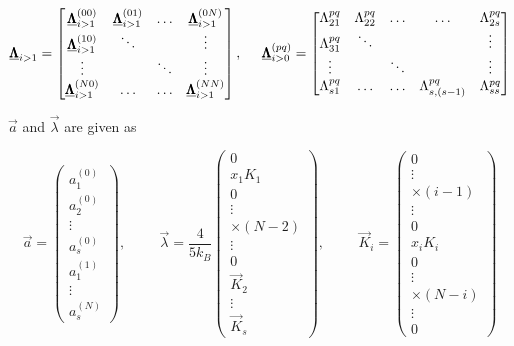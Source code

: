 \begin{equation}
    \underline{\pmb{\Lambda}}_{i>1} = 
    \begin{bmatrix}
        \underline{\pmb{\Lambda}}_{i>1}^{(00)} & \underline{\pmb{\Lambda}}_{i>1}^{(01)} & \hdots & \underline{\pmb{\Lambda}}_{i>1}^{(0N)} \\
        \underline{\pmb{\Lambda}}_{i>1}^{(10)} & \ddots             &        & \vdots \\
        \vdots             &                    & \ddots & \vdots \\
        \underline{\pmb{\Lambda}}_{i>1}^{(N0)} & \hdots & \hdots  & \underline{\pmb{\Lambda}}_{i>1}^{(NN)}
    \end{bmatrix}, \hspace{.5cm}
    \underline{\pmb{\Lambda}}_{i>0}^{(pq)} = 
    \begin{bmatrix}
        \Lambda_{21}^{pq} & \Lambda_{22}^{pq} & \hdots & \hdots & \Lambda_{2s}^{pq} \\
        \Lambda_{31}^{pq} & \ddots & & & \vdots \\
        \vdots & & \ddots & & \vdots \\
        \Lambda_{s1}^{pq} & \hdots & \hdots & \Lambda_{s,(s-1)}^{pq} & \Lambda_{ss}^{pq}
    \end{bmatrix}
\end{equation}

$\Vec{a}$ and $\Vec{\lambda}$ are given as

\begin{equation}
    \Vec{a} = \begin{pmatrix}a_1^{(0)} \\ a_2^{(0)} \\ \vdots \\ a_s^{(0)} \\ a_1^{(1)} \\ \vdots \\ a_s^{(N)}\end{pmatrix}
    , \hspace{1cm}
    \Vec{\lambda} = \frac{4}{5 k_B} \begin{pmatrix} 0 \\ x_1 K_1 \\ 0 \\ \vdots \\ \times (N - 2) \\ \vdots \\ 0 \\ \Vec{K}_2 \\ \vdots \\ \Vec{K}_s \end{pmatrix}
    , \hspace{1cm}
    \Vec{K}_i =  \begin{pmatrix} 0 \\ \vdots \\ \times (i - 1) \\ \vdots \\ 0 \\ x_i K_i \\ 0 \\ \vdots \\ \times (N - i) \\ \vdots \\ 0 \end{pmatrix}
\end{equation}

